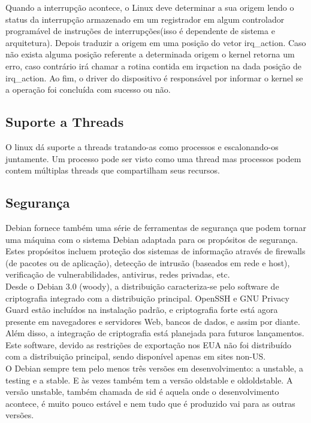 \documentclass[conference]{IEEEtran}
\begin{document}
Quando a interrupção acontece, o Linux deve determinar a sua origem lendo o status da interrupção armazenado em um registrador em algum controlador programável de instruções de interrupções(isso é dependente de sistema e arquitetura). Depois traduzir a origem em uma posição do vetor irq\_action. Caso não exista alguma posição referente a determinada origem o kernel retorna um erro, caso contrário irá chamar a rotina contida em irqaction na dada posição de irq\_action. Ao fim, o driver do dispositivo é responsável por informar o kernel se a operação foi concluída com sucesso ou não\cite{InterruptsLinux}.

\subsection{Suporte a Threads}\label{sec:LinuxThreads}
O linux dá suporte a threads tratando-as como processos e escalonando-os juntamente. Um processo pode ser visto como uma thread mas
processos podem contem múltiplas threads que compartilham seus recursos\cite{LinuxSchedulerIBM}.

\subsection{Segurança}\label{sec:LinuxSec}
Debian fornece também uma série de ferramentas de segurança que podem tornar uma máquina com o sistema Debian adaptada para os propósitos de segurança. Estes propósitos incluem proteção dos sistemas de informação através de firewalls (de pacotes ou de aplicação), detecção de intrusão (baseados em rede e host), verificação de vulnerabilidades, antivirus, redes privadas, etc\cite{SegLinux}.\\

Desde o Debian 3.0 (woody), a distribuição caracteriza-se pelo software de criptografia integrado com a distribuição principal. OpenSSH e GNU Privacy Guard estão incluídos na instalação padrão, e criptografia forte está agora presente em navegadores e servidores Web, bancos de dados, e assim por diante. Além disso, a integração de criptografia está planejada para futuros lançamentos. Este software, devido as restrições de exportação nos EUA não foi distribuído com a distribuição principal, sendo disponível apenas em sites non-US.\cite{SegLinux}\\

O Debian sempre tem pelo menos três versões em desenvolvimento: a unstable, a testing e a stable. E às vezes também tem a versão oldstable e oldoldstable. A versão unstable, também chamada de sid é aquela onde o desenvolvimento acontece, é muito pouco estável e nem tudo que é produzido vai para as outras versões.\\
\end{document}
